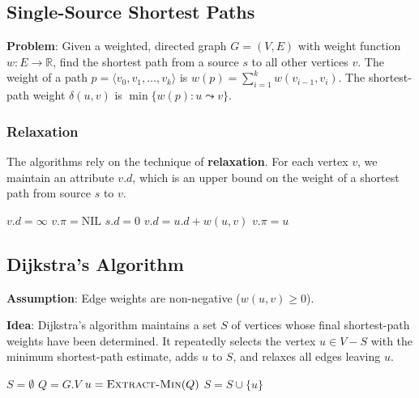 \documentclass[12pt]{article}
\theoremstyle{blueplain}
\theoremstyle{bluedef}
\theoremstyle{blueremark}
\begin{document}
\subsection{Single-Source Shortest Paths}

\textbf{Problem}: Given a weighted, directed graph $G=(V, E)$ with weight function $w: E \to \mathbb{R}$, find the shortest path from a source $s$ to all other vertices $v$.
The weight of a path $p = \langle v_0, v_1, \dots, v_k \rangle$ is $w(p) = \sum_{i=1}^k w(v_{i-1}, v_i)$.
The shortest-path weight $\delta(u, v)$ is $\min \{ w(p) : u \leadsto v \}$.

\subsubsection{Relaxation}
The algorithms rely on the technique of \textbf{relaxation}. For each vertex $v$, we maintain an attribute $v.d$, which is an upper bound on the weight of a shortest path from source $s$ to $v$.

\begin{algorithm}
    \caption{Initialization and Relaxation}\label{alg:relax}
    \begin{algorithmic}[1]
        \State $v.d = \infty$
        \State $v.\pi = \text{NIL}$
        \EndFor
        \State $s.d = 0$
        \EndProcedure
        \Statex
        \State $v.d = u.d + w(u, v)$
        \State $v.\pi = u$
        \EndIf
        \EndProcedure
    \end{algorithmic}
\end{algorithm}

\subsection{Dijkstra's Algorithm}

\textbf{Assumption}: Edge weights are non-negative ($w(u, v) \ge 0$).

\textbf{Idea}: Dijkstra's algorithm maintains a set $S$ of vertices whose final shortest-path weights have been determined. It repeatedly selects the vertex $u \in V - S$ with the minimum shortest-path estimate, adds $u$ to $S$, and relaxes all edges leaving $u$.

\begin{algorithm}
    \caption{Dijkstra's Algorithm}\label{alg:dijkstra}
    \begin{algorithmic}[1]
        \State {}
        \State $S = \emptyset$
        \State $Q = G.V$ 
        \State $u = \Call{Extract-Min}{Q}$
        \State $S = S \cup \{u\}$
        \State {} 
        \EndFor
        \EndWhile
        \EndProcedure
    \end{algorithmic}
\end{algorithm}
\end{document}
